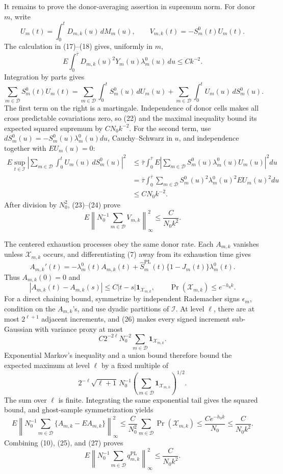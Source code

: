 It remains to prove the donor-averaging assertion in supremum norm.  For donor \(m\), write
\[
 U_m(t)=\int_0^tD_{m,k}(u)\,dM_m(u),
 \qquad
 V_{m,k}(t)=-S_m^0(t)U_m(t).
\]
The calculation in (17)--(18) gives, uniformly in \(m\),
\[
 E\int_0^{\bar\tau}D_{m,k}(u)^2Y_m(u)\lambda_m^0(u)\,du
 \le Ck^{-2}.                                                   \tag{22}
\]
Integration by parts gives
\[
 \sum_{m\in\mathcal D}S_m^0(t)U_m(t)
 =\sum_{m\in\mathcal D}\int_0^tS_m^0(u)\,dU_m(u)
  +\sum_{m\in\mathcal D}\int_0^tU_m(u)\,dS_m^0(u).          \tag{23}
\]
The first term on the right is a martingale.  Independence of donor cells makes all cross predictable covariations zero, so (22) and the maximal inequality bound its expected squared supremum by \(CN_0k^{-2}\).  For the second term, use \(dS_m^0(u)=-S_m^0(u)\lambda_m^0(u)du\), Cauchy--Schwarz in \(u\), and independence together with \(EU_m(u)=0\):
\[
 \begin{aligned}
 E\sup_{t\in\mathcal I}
 \left|\sum_{m\in\mathcal D}\int_0^tU_m(u)\,dS_m^0(u)\right|^2
 &\le \bar\tau\int_0^{\bar\tau}
 E\left|\sum_{m\in\mathcal D}S_m^0(u)\lambda_m^0(u)U_m(u)\right|^2du\\
 &=\bar\tau\int_0^{\bar\tau}\sum_{m\in\mathcal D}
 S_m^0(u)^2\lambda_m^0(u)^2EU_m(u)^2du\\
 &\le CN_0k^{-2}.
 \end{aligned}                                                 \tag{24}
\]
After division by \(N_0^2\), (23)--(24) prove
\[
 E\left\|N_0^{-1}\sum_{m\in\mathcal D}V_{m,k}\right\|_\infty^2
 \le \frac{C}{N_0k^2}.                                      \tag{25}
\]

The centered exhaustion processes obey the same donor rate.  Each \(A_{m,k}\) vanishes unless \(\mathcal X_{m,k}\) occurs, and differentiating (7) away from its exhaustion time gives
\[
 A_{m,k}'(t)=-\lambda_m^0(t)A_{m,k}(t)
 +\widehat S_m^{\mathrm{PL}}(t)\{1-J_m(t)\}\lambda_m^0(t).
\]
Thus \(A_{m,k}(0)=0\) and
\[
 |A_{m,k}(t)-A_{m,k}(s)|
 \le C|t-s|\mathbf 1_{\mathcal X_{m,k}},
 \qquad
 \Pr(\mathcal X_{m,k})\le e^{-h_0k}.                        \tag{26}
\]
For a direct chaining bound, symmetrize by independent Rademacher signs \(\epsilon_m\), condition on the \(A_{m,k}\)'s, and use dyadic partitions of \(\mathcal I\).  At level \(\ell\), there are at most \(2^{\ell+1}\) adjacent increments, and (26) makes every signed increment sub-Gaussian with variance proxy at most
\[
 C2^{-2\ell}N_0^{-2}\sum_{m\in\mathcal D}
 \mathbf 1_{\mathcal X_{m,k}}.
\]
Exponential Markov's inequality and a union bound therefore bound the expected maximum at level \(\ell\) by a fixed multiple of
\[
 2^{-\ell}\sqrt{\ell+1}\,
 N_0^{-1}\left(\sum_{m\in\mathcal D}
 \mathbf 1_{\mathcal X_{m,k}}\right)^{1/2}.
\]
The sum over \(\ell\) is finite.  Integrating the same exponential tail gives the squared bound, and ghost-sample symmetrization yields
\[
 E\left\|N_0^{-1}\sum_{m\in\mathcal D}
 \{A_{m,k}-EA_{m,k}\}\right\|_\infty^2
 \le \frac{C}{N_0^2}\sum_{m\in\mathcal D}
 \Pr(\mathcal X_{m,k})
 \le \frac{Ce^{-h_0k}}{N_0}
 \le \frac{C}{N_0k^2}.                                      \tag{27}
\]
Combining (10), (25), and (27) proves
\[
 E\left\|N_0^{-1}\sum_{m\in\mathcal D}q_{m,k}^{\mathrm{PL}}
 \right\|_\infty^2
 \le \frac{C}{N_0k^2}.                                      \tag{28}
\]

